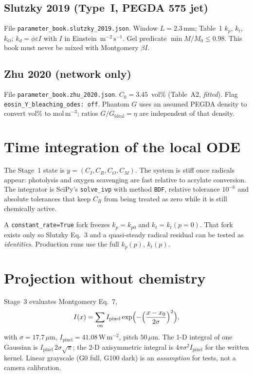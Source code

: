 \subsection{Slutzky 2019 (Type~I, PEGDA 575 jet)}

File \texttt{parameter\_book.slutzky\_2019.json}.
Window $L=2.3\,\mathrm{mm}$; Table~1 $k_p$, $k_t$, $k_O$; $k_d=\phi\varepsilon I$ with $I$ in Einstein~$\mathrm{m^{-2}\,s^{-1}}$.
Gel predicate $\min M/M_0\le 0.98$.
This book must never be mixed with Montgomery $\beta I$.

\subsection{Zhu 2020 (network only)}

File \texttt{parameter\_book.zhu\_2020.json}.
$C_0=3.45$~vol\% (Table~A2, \emph{fitted}).
Flag \texttt{eosin\_Y\_bleaching\_odes: off}.
Phantom $G$ uses an assumed PEGDA density to convert vol\% to $\mathrm{mol\,m^{-3}}$; ratios $G/G_{\mathrm{ideal}}=\eta$ are independent of that density.

\section{Time integration of the local ODE}

The Stage~1 state is $y=(C_I,C_R,C_O,C_M)$.
The system is stiff once radicals appear: photolysis and oxygen scavenging are fast relative to acrylate conversion.
The integrator is SciPy's \texttt{solve\_ivp} with method \texttt{BDF}, relative tolerance $10^{-6}$ and absolute tolerances that keep $C_R$ from being treated as zero while it is still chemically active.

A \texttt{constant\_rate=True} fork freezes $k_p=k_{p0}$ and $k_t=k_t(p=0)$.
That fork exists only so Slutzky Eq.~3 and a quasi-steady radical residual can be tested as \emph{identities}.
Production runs use the full $k_p(p)$, $k_t(p)$.

\section{Projection without chemistry}

Stage~3 evaluates Montgomery Eq.~7,
\begin{equation}
  I(x)=\sum_{\mathrm{on}} I_{\mathrm{pixel}}
  \exp\Bigl(-\Bigl(\frac{x-x_0}{2\sigma}\Bigr)^2\Bigr),
\end{equation}
with $\sigma=17.7\,\mu\mathrm{m}$, $I_{\mathrm{pixel}}=41.08\,\mathrm{W\,m^{-2}}$, pitch $50\,\mu\mathrm{m}$.
The 1-D integral of one Gaussian is $I_{\mathrm{pixel}}\,2\sigma\sqrt{\pi}$; the 2-D axisymmetric integral is $4\pi\sigma^2 I_{\mathrm{pixel}}$ for the written kernel.
Linear grayscale (G0 full, G100 dark) is an \emph{assumption} for tests, not a camera calibration.

